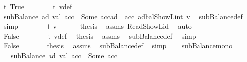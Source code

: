 \begin{isabellebody}
\ t{}{\isacharcolon}{\kern0pt}\ True\isanewline
\ \ \ \ \ \ \isamarkupfalse%
\ t{}\ v{\isacharunderscore}{\kern0pt}def\ \isamarkupfalse%
\ {\isachardoublequoteopen}subBalance\ ad\ val\ acc\ {\isacharequal}{\kern0pt}\ Some\ {\isacharparenleft}{\kern0pt}acc{\isacharparenleft}{\kern0pt}ad\ {\isacharcolon}{\kern0pt}{\isacharequal}{\kern0pt}\ acc\ ad{\isasymlparr}bal{\isacharcolon}{\kern0pt}{\isacharequal}{\kern0pt}ShowL\isactrlsub i\isactrlsub n\isactrlsub t\ v{\isasymrparr}{\isacharparenright}{\kern0pt}{\isacharparenright}{\kern0pt}{\isachardoublequoteclose}\ \isamarkupfalse%
\ subBalance{\isacharunderscore}{\kern0pt}def\ \isamarkupfalse%
\ simp\isanewline
\ \ \ \ \ \ \isamarkupfalse%
\ t{}\ {\isacharbackquoteopen}v\ {\isacharless}{\kern0pt}\ {}\ {\isacharcircum}{\kern0pt}\ {}{}{}{\isacharbackquoteclose}\ \isamarkupfalse%
\ {\isacharquery}{\kern0pt}thesis\ \isamarkupfalse%
\ assms\ Read{\isacharunderscore}{\kern0pt}ShowL{\isacharunderscore}{\kern0pt}id\ \isamarkupfalse%
\ auto\isanewline
\ \ \ \ \isamarkupfalse%
\isanewline
\ \ \ \ \ \ \isamarkupfalse%
\ False\isanewline
\ \ \ \ \ \ \isamarkupfalse%
\ t{}\ v{\isacharunderscore}{\kern0pt}def\ \isamarkupfalse%
\ {\isacharquery}{\kern0pt}thesis\ \isamarkupfalse%
\ assms{\isacharparenleft}{\kern0pt}{}{\isacharparenright}{\kern0pt}\ \isamarkupfalse%
\ subBalance{\isacharunderscore}{\kern0pt}def\ \isamarkupfalse%
\ simp\isanewline
\ \ \ \ \isamarkupfalse%
\isanewline
\ \ \isamarkupfalse%
\isanewline
\ \ \ \ \isamarkupfalse%
\ False\isanewline
\ \ \ \ \isamarkupfalse%
\ \isamarkupfalse%
\ {\isacharquery}{\kern0pt}thesis\ \isamarkupfalse%
\ assms{\isacharparenleft}{\kern0pt}{}{\isacharparenright}{\kern0pt}\ \isamarkupfalse%
\ subBalance{\isacharunderscore}{\kern0pt}def\ \isamarkupfalse%
\ simp\isanewline
\ \ \isamarkupfalse%
\isanewline
{}\isamarkupfalse%
%
\endisatagproof
{\isafoldproof}%
%
\isadelimproof
\isanewline
%
\endisadelimproof
\isanewline
{}\isamarkupfalse%
\ subBalance{\isacharunderscore}{\kern0pt}mono{\isacharcolon}{\kern0pt}\isanewline
\ \ \ {\isachardoublequoteopen}subBalance\ ad\ val\ acc\ {\isacharequal}{\kern0pt}\ Some\ acc{\isacharprime}{\kern0pt}{\isachardoublequoteclose}\isanewline

\end{isabellebody}
